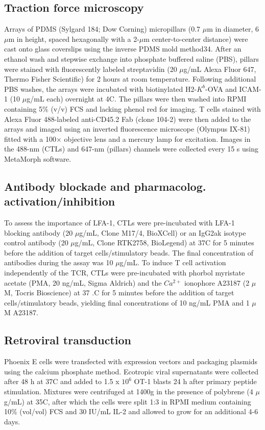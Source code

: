 \subsection{Traction force microscopy}
Arrays of PDMS (Sylgard 184; Dow Corning) micropillars (0.7 $\mu$m in diameter, 6 $\mu$m in height, spaced hexagonally with a 2-$\mu$m center-to-center distance) were cast onto glass coverslips using the inverse PDMS mold method34. After an ethanol wash and stepwise exchange into phosphate buffered saline (PBS), pillars were stained with fluorescently labeled streptavidin (20 $\mu$g/mL Alexa Fluor 647, Thermo Fisher Scientific) for 2 hours at room temperature. Following additional PBS washes, the arrays were incubated with biotinylated H2-$K^{b}$-OVA and ICAM-1 (10 $\mu$g/mL each) overnight at 4\degree C. The pillars were then washed into RPMI containing 5\% (v/v) FCS and lacking phenol red for imaging. T cells stained with Alexa Fluor 488-labeled anti-CD45.2 Fab (clone 104-2) were then added to the arrays and imaged using an inverted fluorescence microscope (Olympus IX-81) fitted with a 100× objective lens and a mercury lamp for excitation. Images in the 488-nm (CTLs) and 647-nm (pillars) channels were collected every 15 s using MetaMorph software.

\subsection{Antibody blockade and pharmacolog. activation/inhibition}
To assess the importance of LFA-1, CTLs were pre-incubated with LFA-1 blocking antibody (20 $\mu$g/mL, Clone M17/4, BioXCell) or an IgG2ak isotype control antibody (20 $\mu$g/mL, Clone RTK2758, BioLegend) at 37\degree C for 5 minutes before the addition of target cells/stimulatory beads. The final concentration of antibodies during the assay was 10 $\mu$g/mL. To induce T cell activation independently of the TCR, CTLs were pre-incubated with phorbol myristate acetate (PMA, 20 ng/mL, Sigma Aldrich) and the $Ca^{2+}$ ionophore A23187 (2 $\mu$M, Tocris Bioscience) at 37 .C for 5 minutes before the addition of target cells/stimulatory beads, yielding final concentrations of 10 ng/mL PMA and 1 $\mu$M A23187.

\subsection{Retroviral transduction}
Phoenix E cells were transfected with expression vectors and packaging plasmids using the calcium phosphate method. Ecotropic viral supernatants were collected after 48 h at 37\degree C and added to 1.5 x $10^{6}$ OT-1 blasts 24 h after primary peptide stimulation. Mixtures were centrifuged at 1400g in the presence of polybrene (4 $\mu$g/mL) at 35\degree C, after which the cells were split 1:3 in RPMI medium containing 10\% (vol/vol) FCS and 30 IU/mL IL-2 and allowed to grow for an additional 4-6 days.

